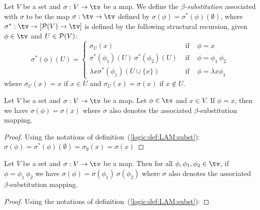 \begin{defin}\label{logic:def:LAM:subst}
Let $V$ be  a set and $\sigma :V\to \tv$ be a map. We define the
{\em $\beta$-substitution} associated with
$\sigma$ to be the map $\sigma:\tv\to\tv$ defined by
$\sigma(\phi)=\sigma^{*}(\phi)(\emptyset)$, where
$\sigma^{*}:\tv\to[{\cal P}(V)\to\tv]$ is defined by the following structural
recursion, given $\phi\in\tv$ and $U\in{\cal P}(V)$:
    \begin{equation}\label{logic:eqn:LAM:subst:1}
                    \sigma^{*}(\phi)(U)=\left\{
                    \begin{array}{lcl}
                    \sigma_{U}(x)&\mbox{\ if\ }&\phi=x\\
                    \sigma^{*}(\phi_{1})(U)\ \sigma^{*}(\phi_{2})(U)
                    &\mbox{\ if\ }&\phi=\phi_{1}\ \phi_{2}\\
                    \lambda x\sigma^{*}(\phi_{1})(U\cup\{x\})&
                    \mbox{\ if\ }&\phi=\lambda x\phi_{1}
                    \end{array}\right.
    \end{equation}
where $\sigma_{U}(x)=x$ if $x\in U$ and
$\sigma_{U}(x)=\sigma(x)$ if $x\not\in U$.
\end{defin}

\begin{prop}\label{logic:prop:LAM:subst:x}
Let $V$ be a set and $\sigma:V\to\tv$ be a map. Let $\phi\in\tv$ and $x\in V$. 
If $\phi = x$, then  we have $\sigma(\phi) = \sigma(x)$ where $\sigma$ also 
denotes the associated $\beta$-substitution mapping.
\end{prop}
\begin{proof}
    Using the notations of definition~(\ref{logic:def:LAM:subst}):
    $\sigma(\phi) = \sigma^{*}(\phi)(\emptyset) = \sigma_{\emptyset}(x)
    =\sigma(x)$
\end{proof}
\begin{prop}\label{logic:prop:LAM:subst:app}
    Let $V$ be a set and $\sigma:V\to\tv$ be a map. 
    Then for all  $\phi,\phi_{1},\phi_{2}\in\tv$, if $\phi = \phi_{1}\ \phi_{2}$
    we have $\sigma(\phi) = \sigma(\phi_{1})\ \sigma(\phi_{2})$ 
    where $\sigma$ also denotes the associated $\beta$-substitution mapping.
\end{prop}
\begin{proof}
    Using the notations of definition~(\ref{logic:def:LAM:subst}):
\end{proof}

